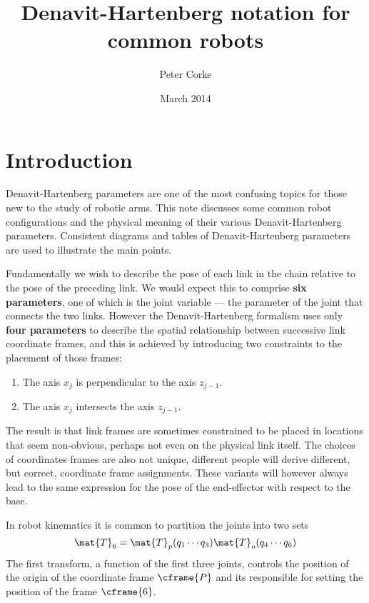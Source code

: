\documentclass[11pt]{article}
\title{Denavit-Hartenberg notation for common robots}
\author{Peter Corke}
\date{March 2014}                                           %
\numberwithin{equation}{section}
\begin{document}
\maketitle

\section{Introduction}

Denavit-Hartenberg parameters are one of the most confusing topics for those new to the study of robotic arms.
This note discusses some common robot configurations and the physical meaning of their various Denavit-Hartenberg parameters.
Consistent diagrams and tables of Denavit-Hartenberg parameters are used to illustrate the main points.

Fundamentally we wish to describe the pose of each link in the chain relative to the pose of the preceding link.
We would expect this to comprise \textbf{six parameters}, one of which is the joint variable --- the parameter of the joint that connects the two links.
However the Denavit-Hartenberg formalism\cite[Ch.~7]{Corke11a} uses only \textbf{four parameters} to describe the spatial relationship between successive link
coordinate frames, and this is achieved by introducing two constraints\cite[p.~78]{Spong06} to the placement of those frames:
\begin{enumerate}
\item The axis $x_j$ is perpendicular to the axis $z_{j-1}$.
\item The axis $x_j$ intersects the axis $z_{j-1}$.
\end{enumerate}
The result is that link frames are sometimes constrained to be placed in locations that seem non-obvious, perhaps not even on the physical link
itself.
The choices of coordinates frames are also not unique, different people will derive different, but correct, coordinate frame assignments\cite{Spong06}.  These variants will however always lead to the same expression for the pose of the end-effector with respect to the base.

In robot kinematics it is common to partition the joints into two sets
\begin{equation}
\mat{T}_6 = \mat{T}_p(q_1 \cdots q_3) \mat{T}_o(q_4 \cdots q_6) \label{eq:1}
\end{equation}
The first transform, a function of the  first three joints, controls the position of the origin of the coordinate frame $\cframe{P}$ and its responsible for setting the position
of the frame $\cframe{6}$.
\end{document}
